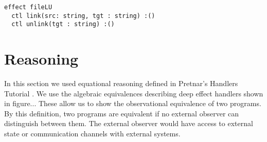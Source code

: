 \documentclass[logo,bsc,singlespacing,parskip]{infthesis}
\begin{document}
\begin{lstlisting}
effect fileLU
  ctl link(src: string, tgt : string) :()
  ctl unlink(tgt : string) :()
\end{lstlisting}



\chapter{Reasoning}

In this section we used equational reasoning defined in Pretnar's Handlers Tutorial \cite{pretnar_introduction_2015}. We use the algebraic equivalences describing deep effect handlers shown in figure... These allow us to show the observational equivalence of two programs. By this definition, two programs are equivalent if no external observer can distinguish between them. 
The external observer would have access to external state or communication channels with external systems.
\end{document}
